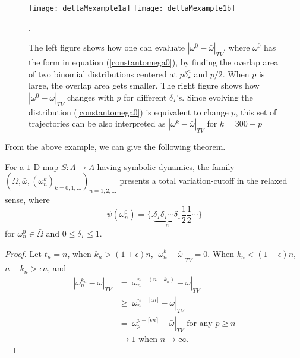 \begin{example}

\begin{figure}
\centerline{{\texttt{[image: deltaMexample1a]}}
            {\texttt{[image: deltaMexample1b]}}}
\caption{\label{deltaMexample1}The left figure shows how one can evaluate
$|\omega^0-\bar{\omega}|_{TV}$, where $\omega^0$ has the form in equation (\ref{constantomega0}),
by finding the overlap area of two binomial distributions centered at $p\delta_\star^a$ and $p/2$.
When $p$ is large, the overlap area gets smaller. The right figure shows how
$|\omega^0-\bar{\omega}|_{TV}$ changes with $p$ for different $\delta_\star$'s. Since evolving
the distribution (\ref{constantomega0}) is equivalent to change $p$, this set of trajectories can
be also interpreted as $|\omega^k-\bar{\omega}|_{TV}$ for $k=300-p$}.
\end{figure}

\end{example}
From the above example, we can give the following theorem.
\begin{theorem}
For a $1$-D map $S:\Lambda \to \Lambda$ having symbolic dynamics, the family \\$(\Omega,\bar{\omega},(\omega^k_n)_{k=0,1,\ldots})_{n=1,2,\ldots}$ presents a total variation-cutoff in the relaxed sense, where
\begin{equation*} 
 \psi(\omega^0_n) =  \{.\underbrace{\delta_\star \delta_\star \cdots \delta_\star}_{n}\frac{1}{2}\frac{1}{2}\cdots\} 
\end{equation*}
for $\omega^0_n\in\bar{\Omega}$ and $0 \le \delta_\star \le 1$. 
\end{theorem}
\begin{proof}
Let $t_n = n$, when $k_n>(1+\epsilon)n$, $|\omega^k_n-\bar{\omega}|_{TV}=0$. When $k_n<(1-\epsilon)n$, $n-k_n>\epsilon n$, and 
\begin{align*}
      |\omega_n^{k_n}-\bar{\omega}|_{TV} &   = |\omega_n^{n-{(n-{k_n})}}-\bar{\omega}|_{TV} \\
                                         & \ge |\omega_n^{n-{\lceil\epsilon n \rceil}}-\bar{\omega}|_{TV}\\
                                         &   = |\omega_p^{{p-{\lceil\epsilon n \rceil}}}-\bar{\omega}|_{TV}  \text{ for any } p\ge n \\
                                         &\to 1 \text{ when } n \to \infty.
\end{align*}
\end{proof}

